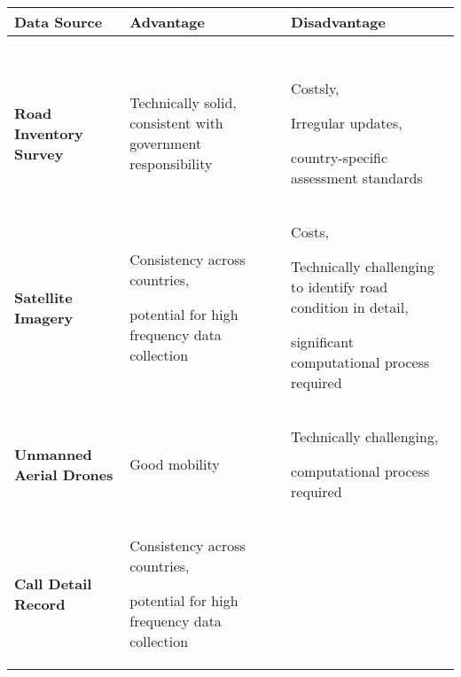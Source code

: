 \begin{table}[]{
\small
    \begin{tabular}{p{2.8cm}p{4.6cm}p{4.6cm}}
    
    
    \toprule
    
    \textbf{Data Source} & \textbf{Advantage} & \textbf{Disadvantage} \\ \midrule
   ~&~&~\\
   
   \textbf{Road Inventory Survey} & 
     
      Technically solid,\newline
      consistent with government responsibility
     
     & 
     
      Costsly,
     
     
      Irregular updates,
     
     
      country-specific assessment standards
     
     \\
    \textbf{Satellite \newline Imagery} &
     
      Consistency across \newline countries,
     
     
      potential for high frequency data collection
     
     & 
     
      Costs,
     
      Technically challenging to identify road condition in detail,
     
     
      significant computational process required
     
     \\
    \textbf{Unmanned Aerial Drones} &
     
      Good mobility
     
     & 
     
      Technically challenging,
     
     
      computational \newline process required
     
     \\
    \textbf{Call \newline Detail Record} & 
     
      Consistency across \newline countries,
     
     
      potential for high frequency data collection
     

\end{tabular}}
\end{table}

